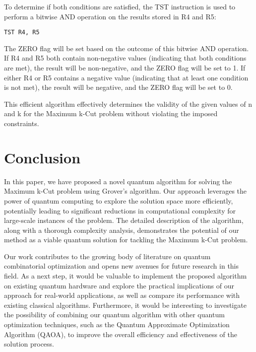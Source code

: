 To determine if both conditions are satisfied, the TST instruction is used to perform a bitwise AND operation on the results stored in R4 and R5:

\begin{verbatim}
TST R4, R5
\end{verbatim}

The ZERO flag will be set based on the outcome of this bitwise AND operation. If R4 and R5 both contain non-negative values (indicating that both conditions are met), the result will be non-negative, and the ZERO flag will be set to 1. If either R4 or R5 contains a negative value (indicating that at least one condition is not met), the result will be negative, and the ZERO flag will be set to 0.

This efficient algorithm effectively determines the validity of the given values of n and k for the Maximum k-Cut problem without violating the imposed constraints.

\section{Conclusion}
\label{sec:conclusion}

In this paper, we have proposed a novel quantum algorithm for solving the Maximum k-Cut problem using Grover's algorithm. Our approach leverages the power of quantum computing to explore the solution space more efficiently, potentially leading to significant reductions in computational complexity for large-scale instances of the problem. The detailed description of the algorithm, along with a thorough complexity analysis, demonstrates the potential of our method as a viable quantum solution for tackling the Maximum k-Cut problem.

Our work contributes to the growing body of literature on quantum combinatorial optimization and opens new avenues for future research in this field. As a next step, it would be valuable to implement the proposed algorithm on existing quantum hardware and explore the practical implications of our approach for real-world applications, as well as compare its performance with existing classical algorithms. Furthermore, it would be interesting to investigate the possibility of combining our quantum algorithm with other quantum optimization techniques, such as the Quantum Approximate Optimization Algorithm (QAOA), to improve the overall efficiency and effectiveness of the solution process.

